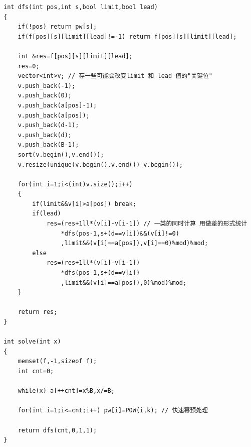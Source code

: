 \begin{verbatim}
int dfs(int pos,int s,bool limit,bool lead)
{
    if(!pos) return pw[s];
    if(f[pos][s][limit][lead]!=-1) return f[pos][s][limit][lead];

    int &res=f[pos][s][limit][lead];
    res=0;
    vector<int>v; // 存一些可能会改变limit 和 lead 值的"关键位"
    v.push_back(-1);
    v.push_back(0);
    v.push_back(a[pos]-1);
    v.push_back(a[pos]);
    v.push_back(d-1);
    v.push_back(d);
    v.push_back(B-1);
    sort(v.begin(),v.end());
    v.resize(unique(v.begin(),v.end())-v.begin());

    for(int i=1;i<(int)v.size();i++)
    {
        if(limit&&v[i]>a[pos]) break;
        if(lead)
            res=(res+1ll*(v[i]-v[i-1]) // 一类的同时计算 用做差的形式统计
                *dfs(pos-1,s+(d==v[i])&&(v[i]!=0)
                ,limit&&(v[i]==a[pos]),v[i]==0)%mod)%mod;
        else
            res=(res+1ll*(v[i]-v[i-1])
                *dfs(pos-1,s+(d==v[i])
                ,limit&&(v[i]==a[pos]),0)%mod)%mod;
    }

    return res;
}

int solve(int x)
{
    memset(f,-1,sizeof f);
    int cnt=0;

    while(x) a[++cnt]=x%B,x/=B;

    for(int i=1;i<=cnt;i++) pw[i]=POW(i,k); // 快速幂预处理

    return dfs(cnt,0,1,1);
}
\end{verbatim}